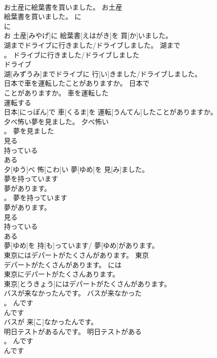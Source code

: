 \documentclass[8pt]{extreport}
\begin{document}
\begin{CJK}{UTF8}{min}
\\	お土産に絵葉書を買いました。	お土産
\\	絵葉書を買いました。	に	
\\	に 
\\	お 土産[みやげ]に 絵葉書[えはがき]を 買[か]いました。	
\\	湖までドライブに行きました/ドライブしました。	湖まで
\\	。	ドライブに行きました/ドライブしました	
\\	ドライブ 
\\	湖[みずうみ]までドライブに 行[い]きました/ドライブしました。	
\\	日本で車を運転したことがありますか。	日本で
\\	ことがありますか。	車を運転した	
\\	運転する 
\\	日本[にっぽん]で 車[くるま]を 運転[うんてん]したことがありますか。	
\\	夕べ怖い夢を見ました。	夕べ怖い
\\	。	夢を見ました	
\\	見る 
\\	持っている 
\\	ある 
\\	夕[ゆう]べ 怖[こわ]い 夢[ゆめ]を 見[み]ました。	
\\	夢を持っています 
\\	夢があります。	
\\	。	夢を持っています 
\\	夢があります。	
\\	見る 
\\	持っている 
\\	ある 
\\	夢[ゆめ]を 持[も]っています/ 夢[ゆめ]があります。	
\\	東京にはデパートがたくさんがあります。	東京
\\	デパートがたくさんがあります。	には	
\\	東京にデパートがたくさんあります。
\\	東京[とうきょう]にはデパートがたくさんがあります。	
\\	バスが来なかったんです。	バスが来なかった
\\	。	んです	
\\	んです 
\\	バスが 来[こ]なかったんです。	
\\	明日テストがあるんです。	明日テストがある
\\	。	んです	
\\	んです 

\end{CJK}
\end{document}
